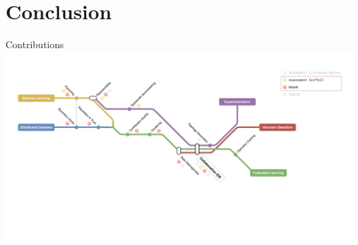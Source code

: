 

\setlength{\titleoffset}{0pt}
\section*{Conclusion}

\begin{frame}
  \sectionpage
\end{frame}

\begin{frame}{Contributions}
  \centering
  \includegraphics[width=1.1\textwidth, center]{figures/intro/metro/12.pdf}%
  
\end{frame}



